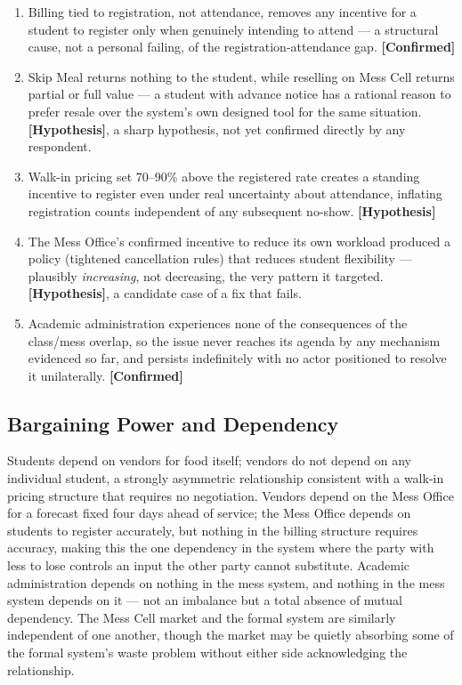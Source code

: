 \documentclass[11pt]{article}
\newcommand{\confirmed}{\textbf{[Confirmed]}}
\newcommand{\hypo}{\textbf{[Hypothesis]}}
\begin{document}
\begin{enumerate}
    \item Billing tied to registration, not attendance, removes any incentive for a
        student to register only when genuinely intending to attend --- a structural
        cause, not a personal failing, of the registration-attendance gap.
        \confirmed
    \item Skip Meal returns nothing to the student, while reselling on Mess Cell
        returns partial or full value --- a student with advance notice has a
        rational reason to prefer resale over the system's own designed tool for the
        same situation. \hypo, a sharp hypothesis, not yet confirmed directly by any
        respondent.
    \item Walk-in pricing set 70--90\% above the registered rate creates a standing
        incentive to register even under real uncertainty about attendance,
        inflating registration counts independent of any subsequent no-show. \hypo
    \item The Mess Office's confirmed incentive to reduce its own workload produced a
        policy (tightened cancellation rules) that reduces student flexibility ---
        plausibly \emph{increasing}, not decreasing, the very pattern it targeted.
        \hypo, a candidate case of a fix that fails.
    \item Academic administration experiences none of the consequences of the
        class/mess overlap, so the issue never reaches its agenda by any mechanism
        evidenced so far, and persists indefinitely with no actor positioned to
        resolve it unilaterally. \confirmed
\end{enumerate}

\subsection{Bargaining Power and Dependency}

Students depend on vendors for food itself; vendors do not depend on any individual
student, a strongly asymmetric relationship consistent with a walk-in pricing
structure that requires no negotiation. Vendors depend on the Mess Office for a
forecast fixed four days ahead of service; the Mess Office depends on students to
register accurately, but nothing in the billing structure requires accuracy, making
this the one dependency in the system where the party with less to lose controls an
input the other party cannot substitute. Academic administration depends on nothing
in the mess system, and nothing in the mess system depends on it --- not an imbalance
but a total absence of mutual dependency. The Mess Cell market and the formal system
are similarly independent of one another, though the market may be quietly absorbing
some of the formal system's waste problem without either side acknowledging the
relationship.
\end{document}
